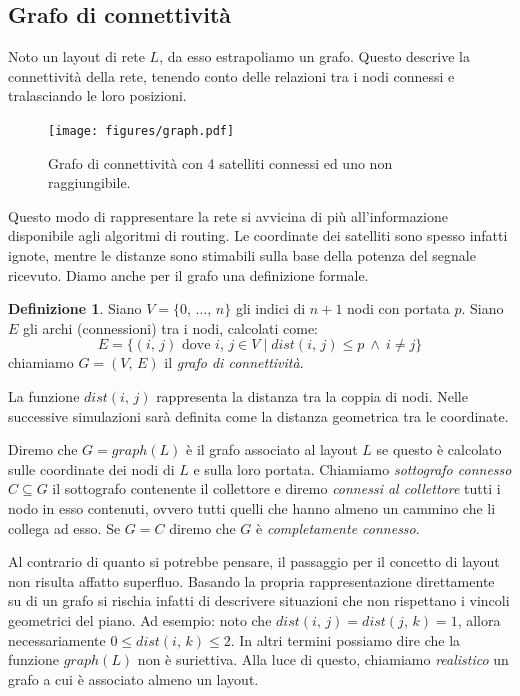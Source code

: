 \documentclass[a4paper,11pt]{article}
\theoremstyle{definition}
\newtheorem{definition}{Definizione}
\begin{document}
\subsection{Grafo di connettività}

Noto un layout di rete $L$, da esso estrapoliamo un grafo. Questo descrive la connettività della rete, tenendo conto delle relazioni tra i nodi connessi e tralasciando le loro posizioni.

\begin{figure}[H]
\centering
\texttt{[image: figures/graph.pdf]}
\caption{Grafo di connettività con 4 satelliti connessi ed uno non raggiungibile.}
\end{figure}

Questo modo di rappresentare la rete si avvicina di più all'informazione disponibile agli algoritmi di routing. Le coordinate dei satelliti sono spesso infatti ignote, mentre le distanze sono stimabili sulla base della potenza del segnale ricevuto. Diamo anche per il grafo una definizione formale.

\begin{definition}
Siano $V = \{0,\,\dots,\,n\}$ gli indici di $n+1$ nodi con portata $p$. Siano $E$ gli archi (connessioni) tra i nodi, calcolati come:
\begin{equation*}
E = \{ (i,\,j) \text{ dove } i,\,j \in V \mid dist(i,\,j) \le p \ \wedge \ i \neq j\}
\end{equation*}
chiamiamo $G = (V,\,E)$ il \emph{grafo di connettività}.
\end{definition}

La funzione $dist(i,\,j)$ rappresenta la distanza tra la coppia di nodi. Nelle successive simulazioni sarà definita come la distanza geometrica tra le coordinate.

Diremo che $G = graph(L)$ è il grafo associato al layout $L$ se questo è calcolato sulle coordinate dei nodi di $L$ e sulla loro portata. Chiamiamo \emph{sottografo connesso} $C \subseteq G$ il sottografo contenente il collettore e diremo \emph{connessi al collettore} tutti i nodo in esso contenuti, ovvero tutti quelli che hanno almeno un cammino che li collega ad esso. Se $G = C$ diremo che $G$ è \emph{completamente connesso}.

Al contrario di quanto si potrebbe pensare, il passaggio per il concetto di layout non risulta affatto superfluo. Basando la propria rappresentazione direttamente su di un grafo si rischia infatti di descrivere situazioni che non rispettano i vincoli geometrici del piano. Ad esempio: noto che $dist(i,\,j) = dist(j,\,k) = 1$, allora necessariamente $0 \leq dist(i,\,k) \leq 2$. In altri termini possiamo dire che la funzione $graph(L)$ non è suriettiva. Alla luce di questo, chiamiamo \emph{realistico} un grafo a cui è associato almeno un layout.
\end{document}

